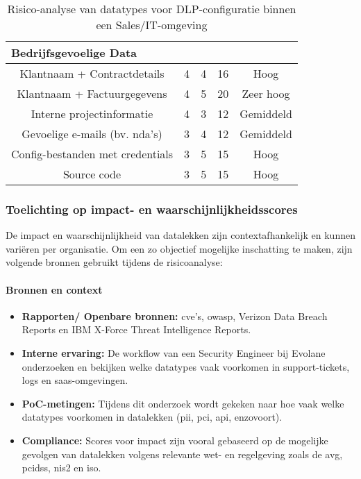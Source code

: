 \begin{table}[h]
\begin{tabular}{|c|c|c|c|c|}
    \hline
    \multicolumn{5}{|l|}{\textbf{Bedrijfsgevoelige Data}} \\
    \hline
    Klantnaam + Contractdetails & 4 & 4 & 16 & Hoog \\
    Klantnaam + Factuurgegevens & 4 & 5 & 20 & Zeer hoog \\
    Interne projectinformatie   & 4 & 3 & 12 & Gemiddeld \\
    Gevoelige e-mails (bv. \gls{nda}'s) & 3 & 4 & 12 & Gemiddeld \\
    Config-bestanden met credentials & 3 & 5 & 15 & Hoog \\
    Source code                 & 3 & 5 & 15 & Hoog \\
    \hline
    \end{tabular}
    \caption{Risico-analyse van datatypes voor DLP-configuratie binnen een Sales/IT-omgeving}
    \label{tab:datatypes_risico_uitgebreid}
\end{table}


\subsubsection{Toelichting op impact- en waarschijnlijkheidsscores}
\label{sec:toelichting_scores}

De impact en waarschijnlijkheid van datalekken zijn contextafhankelijk en kunnen variëren per organisatie. 
Om een zo objectief mogelijke inschatting te maken, zijn volgende bronnen gebruikt tijdens de risicoanalyse:


\paragraph{Bronnen en context}
\begin{itemize}
  \item \textbf{Rapporten/ Openbare bronnen:} \gls{cve}'s, \gls{owasp}, Verizon Data Breach Reports en IBM X-Force Threat Intelligence Reports.
  \item \textbf{Interne ervaring:} De workflow van een Security Engineer bij Evolane onderzoeken en bekijken welke datatypes vaak voorkomen in support-tickets, logs en \gls{saas}-omgevingen. 
  \item \textbf{PoC-metingen:} Tijdens dit onderzoek wordt gekeken naar hoe vaak welke datatypes voorkomen in datalekken (\gls{pii}, \gls{pci}, \gls{api}, enzovoort). 
  \item \textbf{Compliance:} Scores voor impact zijn vooral gebaseerd op de mogelijke gevolgen van datalekken volgens relevante wet- en regelgeving zoals de \gls{avg}, \gls{pcidss}, \gls{nis2} en \gls{iso}.
\end{itemize} 

